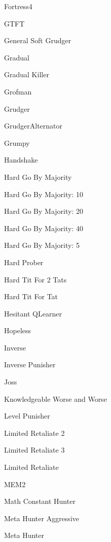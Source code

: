 \item Fortress4~\cite{Ashlock2006}
\item GTFT \cite{Gaudesi2016, Nowak1993}
\item General Soft Grudger~\cite{axelrodproject}
\item Gradual~\cite{Beaufils1997}
\item Gradual Killer~\cite{prison}
\item Grofman\cite{Axelrod1980a}
\item Grudger~\cite{Axelrod1980a, Banks1990, Beaufils1997, Van2015, Li2011}
\item GrudgerAlternator~\cite{prison}
\item Grumpy~\cite{axelrodproject}
\item Handshake~\cite{Robson1990}
\item Hard Go By Majority~\cite{Mittal2009}
\item Hard Go By Majority: 10~\cite{axelrodproject}
\item Hard Go By Majority: 20~\cite{axelrodproject}
\item Hard Go By Majority: 40~\cite{axelrodproject}
\item Hard Go By Majority: 5~\cite{axelrodproject}
\item Hard Prober~\cite{prison}
\item Hard Tit For 2 Tats~\cite{Stewart2012}
\item Hard Tit For Tat~\cite{PD2017}
\item Hesitant QLearner\cite{axelrodproject}
\item Hopeless~\cite{Van2015}
\item Inverse~\cite{axelrodproject}
\item Inverse Punisher~\cite{axelrodproject}
\item Joss~\cite{Axelrod1980a, Stewart2012}
\item Knowledgeable Worse and Worse~\cite{axelrodproject}
\item Level Punisher~\cite{Eckhart2015}
\item Limited Retaliate 2~\cite{axelrodproject}
\item Limited Retaliate 3~\cite{axelrodproject}
\item Limited Retaliate~\cite{axelrodproject}
\item MEM2~\cite{Li2014}
\item Math Constant Hunter~\cite{axelrodproject}
\item Meta Hunter Aggressive~\cite{axelrodproject}
\item Meta Hunter~\cite{axelrodproject}
